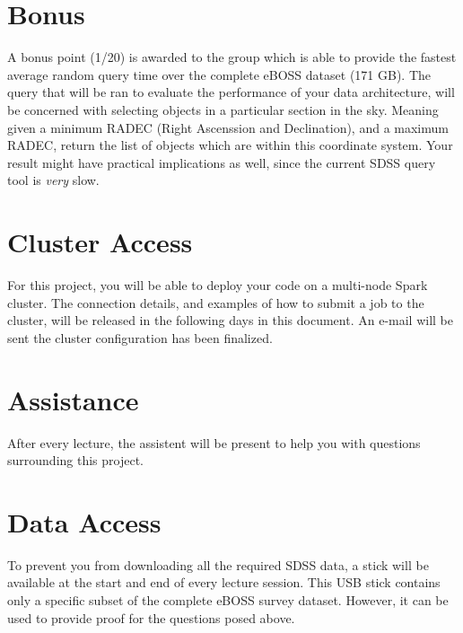 \section{Bonus}
\label{sec:bonus}

A bonus point (1/20) is awarded to the group which is able to provide the fastest average random query time over the complete eBOSS dataset (171 GB). The query that will be ran to evaluate the performance of your data architecture, will be concerned with selecting objects in a particular section in the sky. Meaning given a minimum RADEC (Right Ascenssion and Declination), and a maximum RADEC, return the list of objects which are within this coordinate system. Your result might have practical implications as well, since the current SDSS query tool is \emph{very} slow.

\section{Cluster Access}
\label{sec:cluster_access}

For this project, you will be able to deploy your code on a multi-node Spark cluster. The connection details, and examples of how to submit a job to the cluster, will be released in the following days in this document. An e-mail will be sent the cluster configuration has been finalized.

\section{Assistance}
\label{sec:assistance}

After every lecture, the assistent will be present to help you with questions surrounding this project.

\section{Data Access}
\label{sec:data_access}

To prevent you from downloading all the required SDSS data, a stick will be available at the start and end of every lecture session. This USB stick contains only a specific subset of the complete eBOSS survey dataset. However, it can be used to provide proof for the questions posed above.


